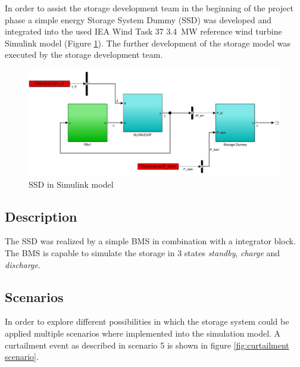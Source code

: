 In order to assist the storage development team in the beginning of the project phase a simple energy Storage System Dummy (SSD) was developed and integrated into the used IEA Wind Task 37 \SI{3.4}{MW} \cite{IEA} reference wind turbine Simulink model (Figure \ref{fig:Storage dummy}).
The further development of the storage model was executed by the storage development team.

\begin{figure}[h]
	\centering	
	\includegraphics[width=12cm]{Figures/StorageDummy}
	\caption{SSD in Simulink model}
	\label{fig:Storage dummy}
\end{figure} 

\subsection*{Description}
The \gls{SSD} was realized by a simple \gls{BMS} in combination with a integrator block.
The \gls{BMS} is capable to simulate the storage in 3 states \textit{standby}, \textit{charge} and \textit{discharge}.

\subsection*{Scenarios}
In order to explore different possibilities in which the storage system could be applied multiple scenarios where implemented into the simulation model.
A curtailment event as described in scenario 5 is shown in figure \ref{fig:curtailment scenario}.

